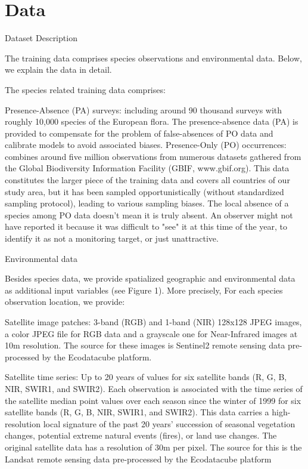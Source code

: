 \section{Data}


Dataset Description

The training data comprises species observations and environmental data. Below, we explain the data in detail.

The species related training data comprises:

Presence-Absence (PA) surveys: including around 90 thousand surveys with roughly 10,000 species of the European flora. The presence-absence data (PA) is provided to compensate for the problem of false-absences of PO data and calibrate models to avoid associated biases.
Presence-Only (PO) occurrences: combines around five million observations from numerous datasets gathered from the Global Biodiversity Information Facility (GBIF, www.gbif.org). This data constitutes the larger piece of the training data and covers all countries of our study area, but it has been sampled opportunistically (without standardized sampling protocol), leading to various sampling biases. The local absence of a species among PO data doesn't mean it is truly absent. An observer might not have reported it because it was difficult to "see" it at this time of the year, to identify it as not a monitoring target, or just unattractive.

Environmental data

Besides species data, we provide spatialized geographic and environmental data as additional input variables (see Figure 1). More precisely, For each species observation location, we provide:

Satellite image patches: 3-band (RGB) and 1-band (NIR) 128x128 JPEG images, a color JPEG file for RGB data and a grayscale one for Near-Infrared images at 10m resolution. The source for these images is Sentinel2 remote sensing data pre-processed by the Ecodatacube platform.

Satellite time series: Up to 20 years of values for six satellite bands (R, G, B, NIR, SWIR1, and SWIR2). Each observation is associated with the time series of the satellite median point values over each season since the winter of 1999 for six satellite bands (R, G, B, NIR, SWIR1, and SWIR2). This data carries a high-resolution local signature of the past 20 years' succession of seasonal vegetation changes, potential extreme natural events (fires), or land use changes. The original satellite data has a resolution of 30m per pixel. The source for this is the Landsat remote sensing data pre-processed by the Ecodatacube platform

